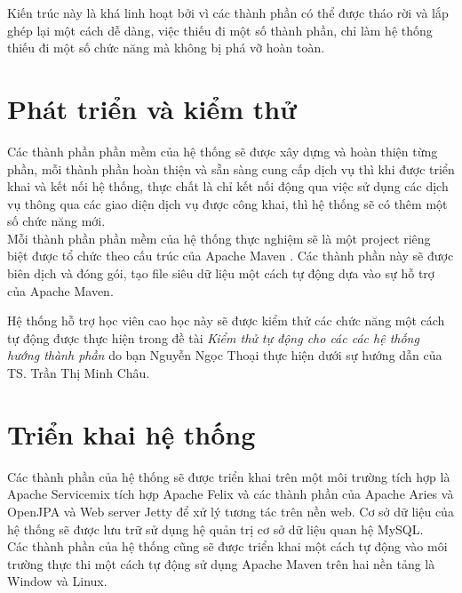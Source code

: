 Kiến trúc này là khá linh hoạt bởi vì các thành phần có thể được tháo rời và lắp ghép lại một cách dễ dàng, việc thiếu đi một số thành phần, chỉ làm hệ thống thiếu đi một số chức năng mà không bị phá vỡ hoàn toàn.

\section{Phát triển và kiểm thử}
Các thành phần phần mềm của hệ thống sẽ được xây dựng và hoàn thiện từng phần, mỗi thành phần hoàn thiện và sẵn sàng cung cấp dịch vụ thì khi được triển khai và kết nối hệ thống, thực chất là chỉ kết nối động qua việc sử dụng các dịch vụ thông qua các giao diện dịch vụ được công khai, thì hệ thống sẽ có thêm một số chức năng mới. \\

Mỗi thành phần phần mềm của hệ thống thực nghiệm sẽ là một project riêng biệt được tổ chức theo cấu trúc của Apache Maven \cite{maven}. Các thành phần này sẽ được biên dịch và đóng gói, tạo file siêu dữ liệu một cách tự động dựa vào sự hỗ trợ của Apache Maven.  

Hệ thống hỗ trợ học viên cao học này sẽ được kiểm thử các chức năng một cách tự động được thực hiện trong đề tài \textit{Kiểm thử tự động cho các các hệ thống hướng thành phần} do bạn Nguyễn Ngọc Thoại thực hiện dưới sự hướng dẫn của TS. Trần Thị Minh Châu. 
\section{Triển khai hệ thống}
Các thành phần của hệ thống sẽ được triển khai trên một môi trường tích hợp là Apache Servicemix \cite{servicemix} tích hợp Apache Felix và các thành phần của Apache Aries và OpenJPA và Web server Jetty \cite{jetty} để xử lý tương tác trên nền web. Cơ sở dữ liệu của hệ thống sẽ được lưu trữ sử dụng hệ quản trị cơ sở dữ liệu quan hệ MySQL.\\

Các thành phần của hệ thống cũng sẽ được triển khai một cách tự động vào môi trường thực thi một cách tự động sử dụng Apache Maven trên hai nền tảng là Window và Linux.

